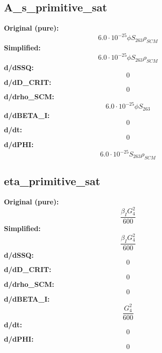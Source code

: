 \subsection{A_s_primitive_sat}
\textbf{Original (pure):}
\begin{equation}
6.0 \cdot 10^{-25} \phi S_{26 3} \rho_{SCM}
\end{equation}
\textbf{Simplified:}
\begin{equation}
6.0 \cdot 10^{-25} \phi S_{26 3} \rho_{SCM}
\end{equation}
\textbf{d/dSSQ:}
\begin{equation}
0
\end{equation}
\textbf{d/dD_CRIT:}
\begin{equation}
0
\end{equation}
\textbf{d/drho_SCM:}
\begin{equation}
6.0 \cdot 10^{-25} \phi S_{26 3}
\end{equation}
\textbf{d/dBETA_I:}
\begin{equation}
0
\end{equation}
\textbf{d/dt:}
\begin{equation}
0
\end{equation}
\textbf{d/dPHI:}
\begin{equation}
6.0 \cdot 10^{-25} S_{26 3} \rho_{SCM}
\end{equation}

\subsection{eta_primitive_sat}
\textbf{Original (pure):}
\begin{equation}
\frac{\beta_{I} G_{4}^{2}}{600}
\end{equation}
\textbf{Simplified:}
\begin{equation}
\frac{\beta_{I} G_{4}^{2}}{600}
\end{equation}
\textbf{d/dSSQ:}
\begin{equation}
0
\end{equation}
\textbf{d/dD_CRIT:}
\begin{equation}
0
\end{equation}
\textbf{d/drho_SCM:}
\begin{equation}
0
\end{equation}
\textbf{d/dBETA_I:}
\begin{equation}
\frac{G_{4}^{2}}{600}
\end{equation}
\textbf{d/dt:}
\begin{equation}
0
\end{equation}
\textbf{d/dPHI:}
\begin{equation}
0
\end{equation}

